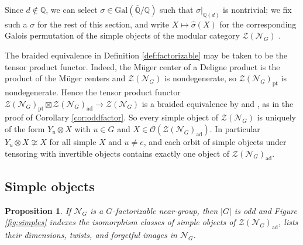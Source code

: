 \documentclass[10pt]{article}
\theoremstyle{plain}
\newtheorem{proposition}[theorem]{Proposition}
\theoremstyle{definition}
\theoremstyle{plain}
\begin{document}
\par Since $d\not\in\mathbb{Q}$, we can select $\sigma\in\mathrm{Gal}(\overline{\mathbb{Q}}/\mathbb{Q})$ such that $\left.\sigma\right|_{\mathbb{Q}(d)}$ is nontrivial; we fix such a $\sigma$ for the rest of this section, and write $X\mapsto\hat\sigma(X)$ for the corresponding Galois permutation of the simple objects of the modular category $\mathcal{Z}(\mathcal{N}_G)$ \cite[Section 2]{MR3486174}.

\par The braided equivalence in Definition \ref{def:factorizable} may be taken to be the tensor product functor. Indeed, the M\"uger center of a Deligne product is the product of the M\"uger centers and $\mathcal{Z}(\mathcal{N}_G)$ is nondegenerate, so $\mathcal{Z}(\mathcal{N}_G)_\mathrm{pt}$ is nondegenerate. Hence the tensor product functor $\mathcal{Z}(\mathcal{N}_G)_\mathrm{pt}\boxtimes\mathcal{Z}(\mathcal{N}_G)_\mathrm{ad}\to\mathcal{Z}(\mathcal{N}_G)$ is a braided equivalence by \cite[Theorem 4.2]{MR1990929} and \cite[Corollary 3.27]{MR2609644}, as in the proof of Corollary \ref{cor:oddfactor}. So every simple object of $\mathcal{Z}(\mathcal{N}_G)$ is uniquely of the form $Y_u\otimes X$ with $u\in G$ and $X\in\mathcal{O}(\mathcal{Z}(\mathcal{N}_G)_\mathrm{ad})$. In particular $Y_u\otimes X\not\cong X$ for all simple $X$ and $u\neq e$, and each orbit of simple objects under tensoring with invertible objects contains exactly one object of $\mathcal{Z}(\mathcal{N}_G)_\mathrm{ad}$.



\subsection{Simple objects}

\begin{proposition}\label{factorprop}
If $\mathcal{N}_G$ is a $G$-factorizable near-group, then $|G|$ is odd and Figure \ref{fig:simples} indexes the isomorphism classes of simple objects of $\mathcal{Z}(\mathcal{N}_G)_\mathrm{ad}$, lists their dimensions, twists, and forgetful images in $\mathcal{N}_G$.
\end{proposition}
\end{document}

